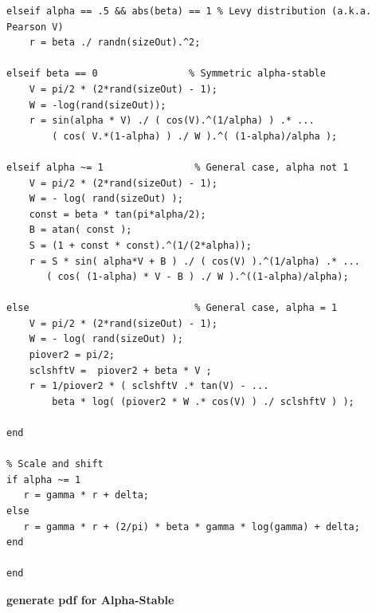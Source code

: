 \documentclass[twoside]{article}
\begin{document}
\begin{lstlisting}
elseif alpha == .5 && abs(beta) == 1 % Levy distribution (a.k.a. Pearson V)
    r = beta ./ randn(sizeOut).^2;

elseif beta == 0                % Symmetric alpha-stable
    V = pi/2 * (2*rand(sizeOut) - 1); 
    W = -log(rand(sizeOut));          
    r = sin(alpha * V) ./ ( cos(V).^(1/alpha) ) .* ...
        ( cos( V.*(1-alpha) ) ./ W ).^( (1-alpha)/alpha ); 

elseif alpha ~= 1                % General case, alpha not 1
    V = pi/2 * (2*rand(sizeOut) - 1); 
    W = - log( rand(sizeOut) );       
    const = beta * tan(pi*alpha/2);
    B = atan( const );
    S = (1 + const * const).^(1/(2*alpha));
    r = S * sin( alpha*V + B ) ./ ( cos(V) ).^(1/alpha) .* ...
       ( cos( (1-alpha) * V - B ) ./ W ).^((1-alpha)/alpha);

else                             % General case, alpha = 1
    V = pi/2 * (2*rand(sizeOut) - 1); 
    W = - log( rand(sizeOut) );          
    piover2 = pi/2;
    sclshftV =  piover2 + beta * V ; 
    r = 1/piover2 * ( sclshftV .* tan(V) - ...
        beta * log( (piover2 * W .* cos(V) ) ./ sclshftV ) );      
          
end
    
% Scale and shift
if alpha ~= 1
   r = gamma * r + delta;
else
   r = gamma * r + (2/pi) * beta * gamma * log(gamma) + delta;  
end

end

\end{lstlisting}
\noindent \textbf {generate pdf for Alpha-Stable}
\end{document}
